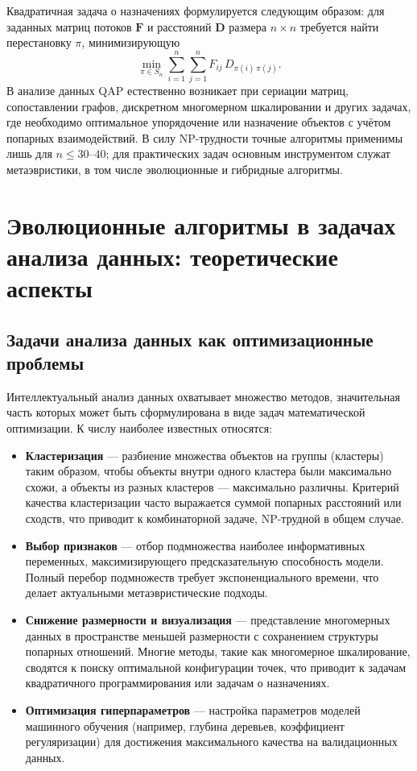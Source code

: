 \documentclass[732]{studrep}
\theoremstyle{nonumberplain}
\begin{document}
Квадратичная задача о назначениях формулируется следующим образом: для заданных матриц потоков $\mathbf{F}$ и расстояний $\mathbf{D}$ размера $n\times n$ требуется найти перестановку $\pi$, минимизирующую
\[
\min_{\pi \in S_n} \sum_{i=1}^n \sum_{j=1}^n F_{ij} \, D_{\pi(i)\,\pi(j)}.
\]
В анализе данных QAP естественно возникает при сериации матриц, сопоставлении графов, дискретном многомерном шкалировании и других задачах, где необходимо оптимальное упорядочение или назначение объектов с учётом попарных взаимодействий. В силу NP-трудности точные алгоритмы применимы лишь для $n\le 30\text{--}40$; для практических задач основным инструментом служат метаэвристики, в том числе эволюционные и гибридные алгоритмы.

\chapter{Эволюционные алгоритмы в задачах анализа данных: теоретические аспекты}
\section{Задачи анализа данных как оптимизационные проблемы}

Интеллектуальный анализ данных охватывает множество методов, значительная часть которых может быть сформулирована в виде задач математической оптимизации. К числу наиболее известных относятся:
\begin{itemize}
\item \textbf{Кластеризация} — разбиение множества объектов на группы (кластеры) таким образом, чтобы объекты внутри одного кластера были максимально схожи, а объекты из разных кластеров — максимально различны. Критерий качества кластеризации часто выражается суммой попарных расстояний или сходств, что приводит к комбинаторной задаче, NP-трудной в общем случае.
\item \textbf{Выбор признаков} — отбор подмножества наиболее информативных переменных, максимизирующего предсказательную способность модели. Полный перебор подмножеств требует экспоненциального времени, что делает актуальными метаэвристические подходы.
\item \textbf{Снижение размерности и визуализация} — представление многомерных данных в пространстве меньшей размерности с сохранением структуры попарных отношений. Многие методы, такие как многомерное шкалирование, сводятся к поиску оптимальной конфигурации точек, что приводит к задачам квадратичного программирования или задачам о назначениях.
\item \textbf{Оптимизация гиперпараметров} — настройка параметров моделей машинного обучения (например, глубина деревьев, коэффициент регуляризации) для достижения максимального качества на валидационных данных.
\end{itemize}
\end{document}
